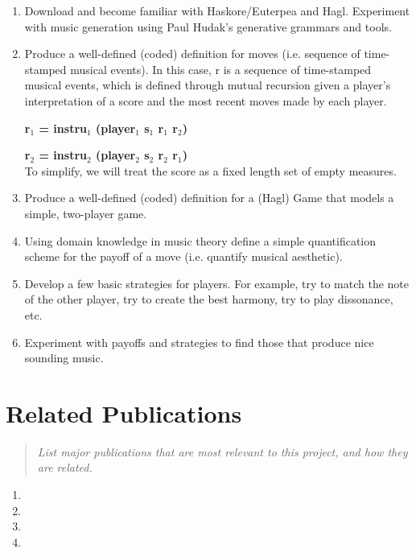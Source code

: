 \documentclass{proc}
\begin{document}
\begin{enumerate}
\item Download and become familiar with Haskore/Euterpea and Hagl.  Experiment with music generation using Paul Hudak's generative grammars and tools.

\item Produce a well-defined (coded) definition for moves (i.e. sequence of time-stamped musical events).  In this case, r is a sequence of time-stamped musical events, which is defined through mutual recursion given a player's interpretation of a score and the most recent moves made by each player.

\textbf{r$_{1}$ = instru$_{1}$ (player$_{1}$ s$_{1}$ r$_{1}$ r$_{2}$)} 

\textbf{r$_{2}$ = instru$_{2}$ (player$_{2}$ s$_{2}$ r$_{2}$ r$_{1}$)}  \\

 To simplify, we will treat the score as a fixed length set of empty measures.

\item Produce a well-defined (coded) definition for a (Hagl) Game that models a simple, two-player game.

\item Using domain knowledge in music theory define a simple quantification scheme for the payoff of a move (i.e. quantify musical aesthetic).

\item Develop a few basic strategies for players.  For example, try to match the note of the other player, try to create the best harmony, try to play dissonance, etc.

\item Experiment with payoffs and strategies to find those that produce nice sounding music.

\end{enumerate}

\section{Related Publications}
\begin{quote}
\textit{List major publications that are most relevant to this project, and how they are related.}
\end{quote}

\begin{enumerate} 
\item {}
\item {}
\item {}
\item {}
\end{enumerate}
\end{document}
